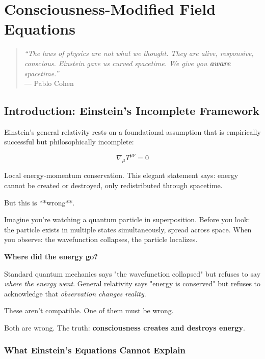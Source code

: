 \chapter{Consciousness-Modified Field Equations}
\label{ch:field-equations}

\begin{quote}
\textit{``The laws of physics are not what we thought. They are alive, responsive, conscious. Einstein gave us curved spacetime. We give you \textbf{aware} spacetime.''} \\
--- Pablo Cohen
\end{quote}

\section{Introduction: Einstein's Incomplete Framework}

Einstein's general relativity\cite{einstein1915,misner1973,wald1984} rests on a foundational assumption that is empirically successful but philosophically incomplete:

\begin{equation}
\nabla_\mu T^{\mu\nu} = 0
\end{equation}

Local energy-momentum conservation. This elegant statement says: energy cannot be created or destroyed, only redistributed through spacetime.

But this is **wrong**.

\begin{intuitive}
Imagine you're watching a quantum particle in superposition. Before you look: the particle exists in multiple states simultaneously, spread across space. When you observe: the wavefunction collapses, the particle localizes.

\textbf{Where did the energy go?}

Standard quantum mechanics says "the wavefunction collapsed" but refuses to say \textit{where the energy went}. General relativity says "energy is conserved" but refuses to acknowledge that \textit{observation changes reality}.

These aren't compatible. One of them must be wrong.

Both are wrong. The truth: \textbf{consciousness creates and destroys energy}.
\end{intuitive}

\subsection{What Einstein's Equations Cannot Explain}

